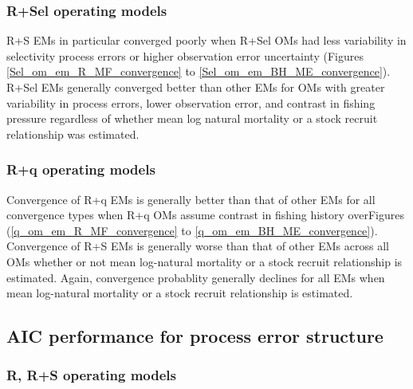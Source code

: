 \documentclass[
  12pt,
]{article}
\begin{document}
\hypertarget{rsel-operating-models}{%
\subsubsection*{R+Sel operating models}\label{rsel-operating-models}}

R+S EMs in particular converged poorly when R+Sel OMs had less
variability in selectivity process errors or higher observation error
uncertainty (Figures \ref{Sel_om_em_R_MF_convergence} to
\ref{Sel_om_em_BH_ME_convergence}). R+Sel EMs generally converged better
than other EMs for OMs with greater variability in process errors, lower
observation error, and contrast in fishing pressure regardless of
whether mean log natural mortality or a stock recruit relationship was
estimated.

\hypertarget{rq-operating-models}{%
\subsubsection*{R+q operating models}\label{rq-operating-models}}

Convergence of R+q EMs is generally better than that of other EMs for
all convergence types when R+q OMs assume contrast in fishing history
overFigures (\ref{q_om_em_R_MF_convergence} to
\ref{q_om_em_BH_ME_convergence}). Convergence of R+S EMs is generally
worse than that of other EMs across all OMs whether or not mean
log-natural mortality or a stock recruit relationship is estimated.
Again, convergence probablity generally declines for all EMs when mean
log-natural mortality or a stock recruit relationship is estimated.

\hypertarget{aic-performance-for-process-error-structure}{%
\subsection*{AIC performance for process error
structure}\label{aic-performance-for-process-error-structure}}

\hypertarget{r-rs-operating-models-1}{%
\subsubsection*{R, R+S operating models}\label{r-rs-operating-models-1}}
\end{document}
